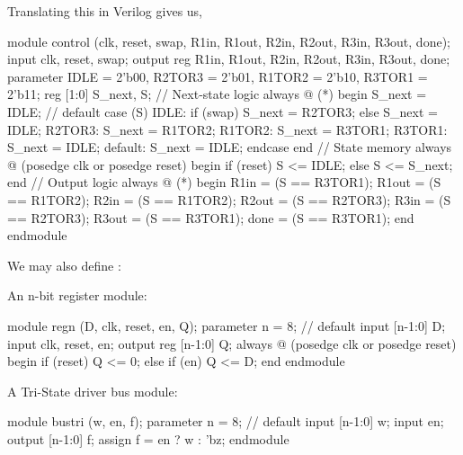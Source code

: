 \documentclass[12pt,openany]{book}
\begin{document}
\begin{minipage}[htp]{1\textwidth}
	Translating this in Verilog gives us,
	\begin{vhdl}
	module control (clk, reset, swap, R1in, R1out, R2in, R2out, R3in, R3out, done);
		input clk, reset, swap;
		output reg R1in, R1out, R2in, R2out, R3in, R3out, done;
		parameter IDLE = 2'b00, R2TOR3 = 2'b01, R1TOR2 = 2'b10, R3TOR1 = 2'b11;
		reg [1:0] S_next, S;
		// Next-state logic
		always @ (*) begin
			S_next = IDLE; // default
			case (S)
			IDLE: if (swap) S_next = R2TOR3;
				else S_next = IDLE;
				R2TOR3: S_next = R1TOR2;
				R1TOR2: S_next = R3TOR1;
				R3TOR1: S_next = IDLE;
				default: S_next = IDLE;
		endcase
		end
		// State memory
		always @ (posedge clk or posedge reset) begin
				if (reset) S <= IDLE;
				else S <= S_next;
			end
			// Output logic
			always @ (*) begin
				R1in = (S == R3TOR1);
				R1out = (S == R1TOR2);
				R2in = (S == R1TOR2);
				R2out = (S == R2TOR3);
				R3in = (S == R2TOR3);
				R3out = (S == R3TOR1);
				done = (S == R3TOR1);
		end
	endmodule
	\end{vhdl}
	
\end{minipage}
\newline

\begin{minipage}[htp]{1\textwidth}
	We may also define :\newline
	\begin{minipage}[htp]{0.45\textwidth}
		An n-bit register module:
		\begin{vhdl}
	module regn (D, clk, reset, en, Q);
		parameter n = 8; // default
		input [n-1:0] D;
		input clk, reset, en;
		output reg [n-1:0] Q;
		always @ (posedge clk or posedge reset) begin
		if (reset) Q <= 0;
		else if (en) Q <= D;
		end
	endmodule
		\end{vhdl}
	\end{minipage}
	\hfill
	\vline
	\hfill
	\begin{minipage}[htp]{0.45\textwidth}
		A Tri-State driver bus module:
		\begin{vhdl}
module bustri (w, en, f);
	parameter n = 8; // default
	input [n-1:0] w;
	input en;
	output [n-1:0] f;
	assign f = en ? w : 'bz;
endmodule
		\end{vhdl}
	\end{minipage}
\end{minipage}
\newline
\vfill
\end{document}
